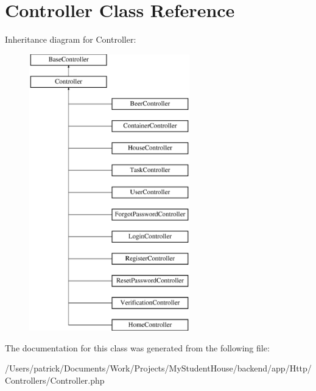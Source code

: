 \hypertarget{class_app_1_1_http_1_1_controllers_1_1_controller}{}\section{Controller Class Reference}
\label{class_app_1_1_http_1_1_controllers_1_1_controller}
Inheritance diagram for Controller\+:\begin{figure}[H]
\begin{center}
\leavevmode
\includegraphics[height=12.000000cm]{class_app_1_1_http_1_1_controllers_1_1_controller}
\end{center}
\end{figure}


The documentation for this class was generated from the following file\+:\begin{DoxyCompactItemize}
\item 
/\+Users/patrick/\+Documents/\+Work/\+Projects/\+My\+Student\+House/backend/app/\+Http/\+Controllers/Controller.\+php\end{DoxyCompactItemize}
